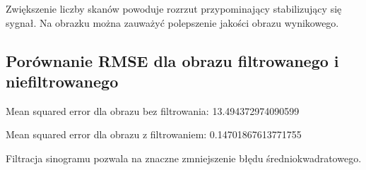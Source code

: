 \documentclass[11pt,a4paper]{article}
\begin{document}
    Zwiększenie liczby skanów powoduje rozrzut przypominający stabilizujący się sygnał.
    Na obrazku można zauważyć polepszenie jakości obrazu wynikowego.

    \subsection{Porównanie RMSE dla obrazu filtrowanego i niefiltrowanego}
    Mean squared error dla obrazu bez filtrowania: 13.494372974090599

    Mean squared error dla obrazu z filtrowaniem: 0.14701867613771755

    Filtracja sinogramu pozwala na znaczne zmniejszenie błędu średniokwadratowego.
\end{document}

